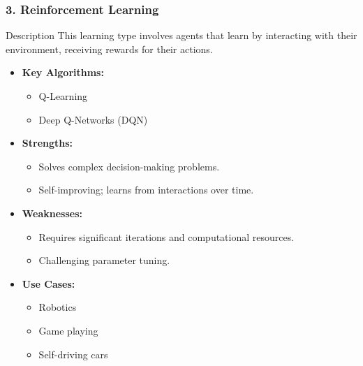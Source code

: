 \documentclass[aspectratio=169]{beamer}
\begin{document}
\begin{frame}[fragile]
    \frametitle{3. Reinforcement Learning}
    \begin{block}{Description}
        This learning type involves agents that learn by interacting with their environment, receiving rewards for their actions.
    \end{block}
    \begin{itemize}
        \item \textbf{Key Algorithms:}
            \begin{itemize}
                \item Q-Learning
                \item Deep Q-Networks (DQN)
            \end{itemize}
        \item \textbf{Strengths:}
            \begin{itemize}
                \item Solves complex decision-making problems.
                \item Self-improving; learns from interactions over time.
            \end{itemize}
        \item \textbf{Weaknesses:}
            \begin{itemize}
                \item Requires significant iterations and computational resources.
                \item Challenging parameter tuning.
            \end{itemize}
        \item \textbf{Use Cases:}
            \begin{itemize}
                \item Robotics
                \item Game playing
                \item Self-driving cars
            \end{itemize}
    \end{itemize}
\end{frame}
\end{document}
